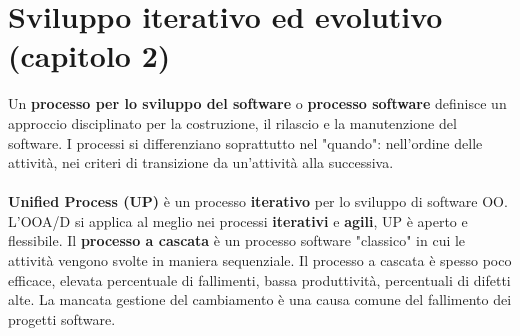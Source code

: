 \documentclass{article}
\numberwithin{equation}{subsection}
\begin{document}
\section{Sviluppo iterativo ed evolutivo (capitolo 2)}
Un \textbf{processo per lo sviluppo del software} o \textbf{processo software} definisce un approccio disciplinato per la costruzione, il rilascio e la manutenzione del software. I processi si differenziano soprattutto nel "quando": nell'ordine delle attività, nei criteri di transizione da un'attività alla successiva.\\\\
\textbf{Unified Process (UP)} è un processo \textbf{iterativo} per lo sviluppo di software OO. L'OOA/D si applica al meglio nei processi \textbf{iterativi} e \textbf{agili}, UP è aperto e flessibile. Il \textbf{processo a cascata} è un processo software "classico" in cui le attività vengono svolte in maniera sequenziale. Il processo a cascata è spesso poco efficace, elevata percentuale di fallimenti, bassa produttività, percentuali di difetti alte. La mancata gestione del cambiamento è una causa comune del fallimento dei progetti software. \\\\
\end{document}

